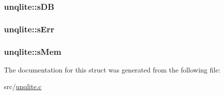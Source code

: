 \hypertarget{structunqlite_aa57bcec2471c4870913bf69db8374180}{
\subsubsection[{s\-D\-B}]{ unqlite\-::s\-D\-B}}\label{d6/d0c/structunqlite_aa57bcec2471c4870913bf69db8374180}
\hypertarget{structunqlite_a741906f273a1b0ef7a748c45ad653a93}{
\subsubsection[{s\-Err}]{ unqlite\-::s\-Err}}\label{d6/d0c/structunqlite_a741906f273a1b0ef7a748c45ad653a93}
\hypertarget{structunqlite_a502b27aa1d66ab429f7048adf43669cd}{
\subsubsection[{s\-Mem}]{ unqlite\-::s\-Mem}}\label{d6/d0c/structunqlite_a502b27aa1d66ab429f7048adf43669cd}


The documentation for this struct was generated from the following file\-:\begin{DoxyCompactItemize}
\item 
src/\hyperlink{unqlite_8c}{unqlite.\-c}\end{DoxyCompactItemize}
